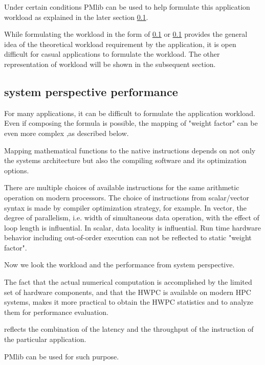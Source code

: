 \documentclass[conference]{IEEEtran}
\begin{document}
Under certain conditions
PMlib can be used to help formulate this application workload as explained
in the later section \ref{}.

While formulating the workload in the form of
\ref{}
or
\ref{}
provides the general idea of the theoretical workload requirement by the
application, it is open difficult for casual applications to formulate
the workload. The other representation of workload will be shown in
the subsequent section.

\subsection{system perspective performance}

For many applications, it can be difficult to formulate
the application workload.
Even if composing the formula is possible, the mapping of "weight factor"
can be even more complex ,as described below.

Mapping mathematical functions to the native instructions
depends on not only the systems architecture but also the compiling software
and its optimization options.

There are multiple choices of available instructions for the same
arithmetic operation on modern processors.
The choice of instructions from scalar/vector syntax is made by
compiler optimization strategy, for example.
In vector, the degree of parallelism, i.e. width of simultaneous data
operation, with the effect of loop length is influential.
In scalar, data locality is influential.
Run time hardware behavior including out-of-order execution can not
be reflected to static "weight factor".

Now we look the workload and the performance from system perspective.

The fact that the actual numerical computation is accomplished by the
limited set of hardware components, and that the HWPC is available
on modern HPC systems, makes it more practical to obtain the HWPC statistics
and to analyze them for performance evaluation.

reflects the combination of the latency and the throughput of the instruction
of the particular application.

PMlib can be used for such purpose.

%
%
\end{document}
